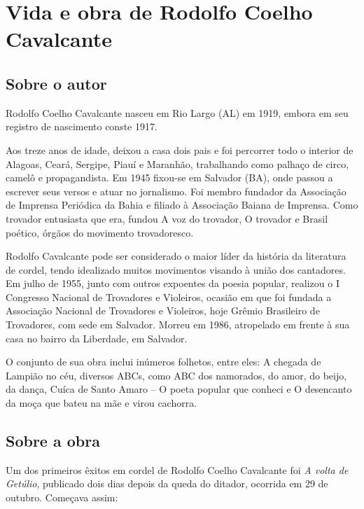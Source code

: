 \chapter{Vida e obra de Rodolfo Coelho Cavalcante}

\section{Sobre o autor}

Rodolfo Coelho Cavalcante nasceu em Rio Largo (AL) em 1919, embora em
seu registro de nascimento conste 1917. 

Aos treze anos de idade, deixou a casa dois pais e foi percorrer todo o
interior de Alagoas, Ceará, Sergipe, Piauí e Maranhão, trabalhando como
palhaço de circo, camelô e propagandista. Em 1945 fixou-se em Salvador
(BA), onde passou a escrever seus versos e atuar no jornalismo. Foi
membro fundador da Associação de Imprensa Periódica da Bahia e filiado
à Associação Baiana de Imprensa. Como trovador entusiasta que era,
fundou A voz do trovador, O trovador e Brasil poético, órgãos do
movimento trovadoresco.

Rodolfo Cavalcante pode ser considerado o maior líder da história da
literatura de cordel, tendo idealizado muitos movimentos visando à
união dos cantadores. Em julho de 1955, junto com outros expoentes da
poesia popular, realizou o I Congresso Nacional de Trovadores e
Violeiros, ocasião em que foi fundada a Associação Nacional de
Trovadores e Violeiros, hoje Grêmio Brasileiro de Trovadores, com sede
em Salvador. Morreu em 1986, atropelado em frente à sua casa no bairro
da Liberdade, em Salvador.

O conjunto de sua obra inclui inúmeros folhetos, entre eles: A chegada
de Lampião no céu, diversos ABCs, como ABC dos namorados, do amor, do
beijo, da dança, Cuíca de Santo Amaro – O poeta popular que conheci e O
desencanto da moça que bateu na mãe e virou cachorra.

\section{Sobre a obra}

Um dos primeiros êxitos em cordel de Rodolfo Coelho Cavalcante foi \textit{A volta de Getúlio}, publicado dois dias depois da queda do ditador, ocorrida em 29 de
outubro. Começava assim: 

